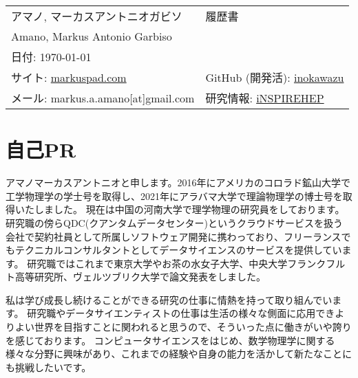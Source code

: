 \documentclass[fontsize=12pt]{ltjarticle}
\begin{document}
\begin{center}
  \begin{tabularx}{\textwidth} { 
      >{\raggedright\arraybackslash}X 
    >{\raggedleft\arraybackslash}X  }
    \large アマノ, マーカスアントニオガビソ & 履歴書\\
    \large Amano, Markus Antonio Garbiso & \\
    \large 日付: \today & \\
    \hline
    サイト: \href{https://markuspad.com/}{markuspad.com}& 
    GitHub (開発活): \href{https://github.com/inokawazu}{inokawazu}\\
    メール: markus.a.amano[at]gmail.com & 研究情報: \href{https://inspirehep.net/authors/1778034}{iNSPIREHEP}\\
  \end{tabularx}
\end{center}


\section*{自己PR}

アマノマーカスアントニオと申します。2016年にアメリカのコロラド鉱山大学で工学物理学の学士号を取得し、2021年にアラバマ大学で理論物理学の博士号を取得いたしました。
現在は中国の河南大学で理学物理の研究員をしております。
研究職の傍らQDC(クアンタムデータセンター)というクラウドサービスを扱う会社で契約社員として所属しソフトウェア開発に携わっており、フリーランスでもテクニカルコンサルタントとしてデータサイエンスのサービスを提供しています。
研究職ではこれまで東京大学やお茶の水女子大学、中央大学フランクフルト高等研究所、ヴェルツブリク大学で論文発表をしました。

私は学び成長し続けることができる研究の仕事に情熱を持って取り組んでいます。
研究職やデータサイエンティストの仕事は生活の様々な側面に応用できよりよい世界を目指すことに関われると思うので、そういった点に働きがいや誇りを感じております。
コンピュータサイエンスをはじめ、数学物理学に関する様々な分野に興味があり、これまでの経験や自身の能力を活かして新たなことにも挑戦したいです。
\end{document}
